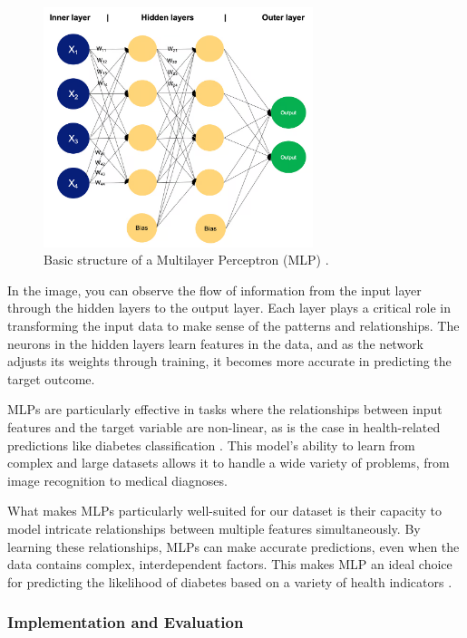 \begin{figure}[H]
    \centering
    \includegraphics[width=0.7\textwidth]{images/mlp-diagram.png}
    \caption{Basic structure of a Multilayer Perceptron (MLP) \cite{mlp}.}
    \label{fig:mlp}
\end{figure}

In the image, you can observe the flow of information from the input layer through the hidden layers to the output layer. Each layer plays a critical role in transforming the input data to make sense of the patterns and relationships. The neurons in the hidden layers learn features in the data, and as the network adjusts its weights through training, it becomes more accurate in predicting the target outcome.

MLPs are particularly effective in tasks where the relationships between input features and the target variable are non-linear, as is the case in health-related predictions like diabetes classification \cite{deeplearning1}. This model's ability to learn from complex and large datasets allows it to handle a wide variety of problems, from image recognition to medical diagnoses.

What makes MLPs particularly well-suited for our dataset is their capacity to model intricate relationships between multiple features simultaneously. By learning these relationships, MLPs can make accurate predictions, even when the data contains complex, interdependent factors. This makes MLP an ideal choice for predicting the likelihood of diabetes based on a variety of health indicators \cite{mlp}.

\subsubsection{Implementation and Evaluation}

